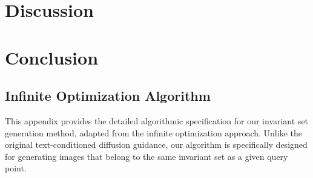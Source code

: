 \documentclass[licencjacka,en]{pracamgr}
\begin{document}
\chapter{Discussion}\label{r:discussion}

\chapter{Conclusion}\label{r:conclusion}
\appendix

\section{Infinite Optimization Algorithm}\label{appendix:infinite_optimization}
This appendix provides the detailed algorithmic specification for our invariant set generation method, adapted from the infinite optimization approach. Unlike the original text-conditioned diffusion guidance, our algorithm is specifically designed for generating images that belong to the same invariant set as a given query point.
\end{document}
